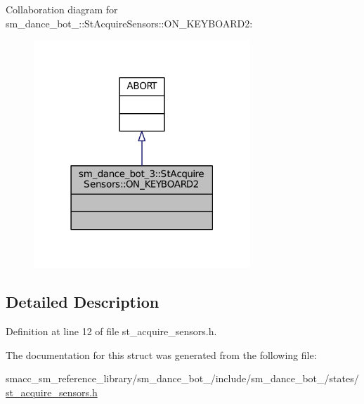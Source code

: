 Collaboration diagram for sm\+\_\+dance\+\_\+bot\+\_\+:\+:St\+Acquire\+Sensors\+:\+:O\+N\+\_\+\+K\+E\+Y\+B\+O\+A\+R\+D2\+:
\nopagebreak
\begin{figure}[H]
\begin{center}
\leavevmode
\includegraphics[width=231pt]{structsm__dance__bot__3_1_1StAcquireSensors_1_1ON__KEYBOARD2__coll__graph}
\end{center}
\end{figure}


\subsection{Detailed Description}


Definition at line 12 of file st\+\_\+acquire\+\_\+sensors.\+h.



The documentation for this struct was generated from the following file\+:\begin{DoxyCompactItemize}
\item 
smacc\+\_\+sm\+\_\+reference\+\_\+library/sm\+\_\+dance\+\_\+bot\+\_/include/sm\+\_\+dance\+\_\+bot\+\_/states/\hyperlink{3_2include_2sm__dance__bot__3_2states_2st__acquire__sensors_8h}{st\+\_\+acquire\+\_\+sensors.\+h}\end{DoxyCompactItemize}
